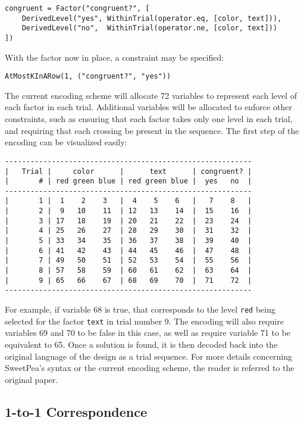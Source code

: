 \begin{verbatim}
congruent = Factor("congruent?", [
    DerivedLevel("yes", WithinTrial(operator.eq, [color, text])),
    DerivedLevel("no",  WithinTrial(operator.ne, [color, text]))
])
\end{verbatim}

With the factor now in place, a constraint may be specified:

\begin{verbatim}
AtMostKInARow(1, ("congruent?", "yes"))
\end{verbatim}

The current encoding scheme will allocate 72 variables to represent each level of each factor in each trial. Additional variables will be allocated to enforce other constraints, such as ensuring that each factor takes only one level in each trial, and requiring that each crossing be present in the sequence. The first step of the encoding can be visualized easily:

\begin{verbatim}
----------------------------------------------------------
|   Trial |     color      |      text      | congruent? |
|       # | red green blue | red green blue |  yes   no  |
----------------------------------------------------------
|       1 |  1    2    3   |  4    5    6   |   7    8   |
|       2 |  9   10    11  | 12   13    14  |  15    16  |
|       3 | 17   18    19  | 20   21    22  |  23    24  |
|       4 | 25   26    27  | 28   29    30  |  31    32  |
|       5 | 33   34    35  | 36   37    38  |  39    40  |
|       6 | 41   42    43  | 44   45    46  |  47    48  |
|       7 | 49   50    51  | 52   53    54  |  55    56  |
|       8 | 57   58    59  | 60   61    62  |  63    64  |
|       9 | 65   66    67  | 68   69    70  |  71    72  |
----------------------------------------------------------
\end{verbatim}

For example, if variable 68 is true, that corresponds to the level \texttt{red} being selected for the factor \texttt{text} in trial number 9. The encoding will also require variables 69 and 70 to be false in this case, as well as require variable 71 to be equivalent to 65. Once a solution is found, it is then decoded back into the original language of the design as a trial sequence. For more details concerning SweetPea's syntax or the current encoding scheme, the reader is referred to the original paper.

\subsection{1-to-1 Correspondence}


